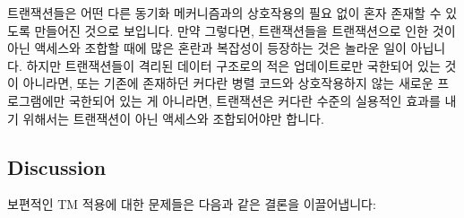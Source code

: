 트랜잭션들은 어떤 다른 동기화 메커니즘과의 상호작용의 필요 없이 혼자 존재할 수
있도록 만들어진 것으로 보입니다.
만약 그렇다면, 트랜잭션들을 트랜잭션으로 인한 것이 아닌 액세스와 조합할 때에
많은 혼란과 복잡성이 등장하는 것은 놀라운 일이 아닙니다.
하지만 트랜잭션들이 격리된 데이터 구조로의 적은 업데이트로만 국한되어 있는 것이
아니라면, 또는 기존에 존재하던 커다란 병렬 코드와 상호작용하지 않는 새로운
프로그램에만 국한되어 있는 게 아니라면, 트랜잭션은 커다란 수준의 실용적인
효과를 내기 위해서는 트랜잭션이 아닌 액세스와 조합되어야만 합니다.

\subsection{Discussion}
\label{sec:future:Discussion}

보편적인 TM 적용에 대한 문제들은 다음과 같은 결론을 이끌어냅니다:

